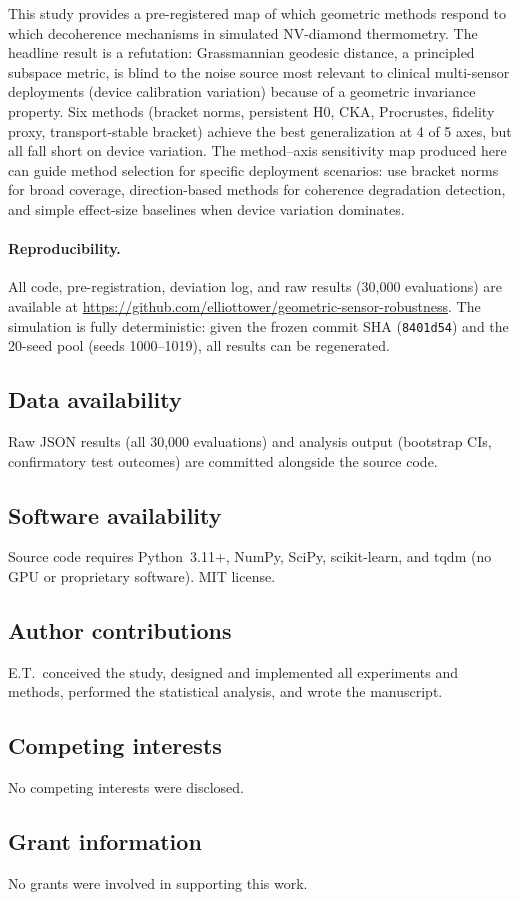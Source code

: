 \documentclass[11pt]{article}
\begin{document}
This study provides a pre-registered map of which geometric methods
respond to which decoherence mechanisms in simulated NV-diamond
thermometry.  The headline result is a refutation: Grassmannian geodesic
distance, a principled subspace metric, is blind to the noise source
most relevant to clinical multi-sensor deployments (device calibration
variation) because of a geometric invariance property.  Six methods (bracket norms, persistent H0, CKA, Procrustes,
fidelity proxy, transport-stable bracket) achieve the best
generalization at 4 of 5 axes, but all fall short on device variation.  The
method--axis sensitivity map produced here can guide method selection for
specific deployment scenarios: use bracket norms for broad coverage,
direction-based methods for coherence degradation detection, and simple
effect-size baselines when device variation dominates.

\paragraph{Reproducibility.}
All code, pre-registration, deviation log, and raw results (30,000
evaluations) are available at
\url{https://github.com/elliottower/geometric-sensor-robustness}.
The simulation is fully deterministic: given the frozen commit SHA
(\texttt{8401d54}) and the 20-seed pool (seeds 1000--1019), all results
can be regenerated.

\subsection*{Data availability}

Raw JSON results (all 30,000 evaluations) and analysis output
(bootstrap CIs, confirmatory test outcomes) are committed alongside
the source code.

\subsection*{Software availability}

Source code requires Python~3.11+, NumPy, SciPy, scikit-learn, and
tqdm (no GPU or proprietary software).  MIT license.

\subsection*{Author contributions}

E.T.\ conceived the study, designed and implemented all experiments and
methods, performed the statistical analysis, and wrote the manuscript.

\subsection*{Competing interests}

No competing interests were disclosed.

\subsection*{Grant information}

No grants were involved in supporting this work.



\end{document}
